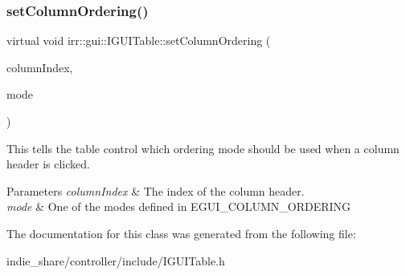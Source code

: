 \subsubsection{\texorpdfstring{set\+Column\+Ordering()}{setColumnOrdering()}}
{\footnotesize\ttfamily virtual void irr\+::gui\+::\+I\+G\+U\+I\+Table\+::set\+Column\+Ordering (\begin{DoxyParamCaption}\item[{\hyperlink{namespaceirr_a0416a53257075833e7002efd0a18e804}{u32}}]{column\+Index,  }\item[{\hyperlink{namespaceirr_1_1gui_a551e22458ae01a7eeaf87c0fbaaabf9a}{E\+G\+U\+I\+\_\+\+C\+O\+L\+U\+M\+N\+\_\+\+O\+R\+D\+E\+R\+I\+NG}}]{mode }\end{DoxyParamCaption})\hspace{0.3cm}{\ttfamily [pure virtual]}}



This tells the table control which ordering mode should be used when a column header is clicked. 


\begin{DoxyParams}{Parameters}
{\em column\+Index} & The index of the column header. \\
\hline
{\em mode} & One of the modes defined in E\+G\+U\+I\+\_\+\+C\+O\+L\+U\+M\+N\+\_\+\+O\+R\+D\+E\+R\+I\+NG \\
\hline
\end{DoxyParams}


The documentation for this class was generated from the following file\+:\begin{DoxyCompactItemize}
\item 
indie\+\_\+share/controller/include/I\+G\+U\+I\+Table.\+h\end{DoxyCompactItemize}
